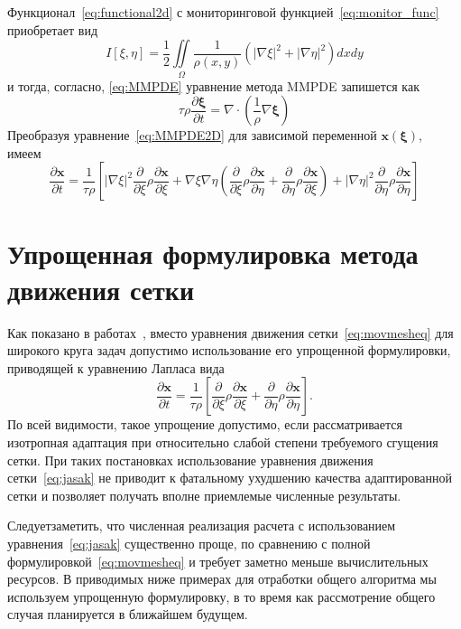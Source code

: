 Функционал~\eqref{eq:functional2d} с мониторинговой функцией~\eqref{eq:monitor_func} приобретает вид 
\begin{equation}
I[\xi,\eta] = \frac{1}{2}\iint\limits_{\Omega}\frac{1}{\rho(x,y)}\left(|\nabla \xi|^2+|\nabla \eta|^2\right)dxdy
\label{eq:2Dfunctional}
\end{equation}
и тогда, согласно, \eqref{eq:MMPDE} уравнение метода MMPDE запишется как 
\begin{equation}
\tau \rho\frac{\partial \boldsymbol\xi}{\partial t} = \nabla\cdot\left(\frac{1}{\rho}\nabla \boldsymbol\xi \right)
\label{eq:MMPDE2D}
\end{equation}
Преобразуя уравнение~\eqref{eq:MMPDE2D} для зависимой переменной  $\mathbf{x}( \boldsymbol\xi)$, имеем~\cite{huang_practical_2001}
\begin{equation}\label{eq:movmesheq}
\frac{\partial \mathbf{x}}{\partial t} = \frac{1}{\tau \rho} 
\left[
|\nabla \xi|^2 \frac{\partial }{\partial \xi}\rho \frac{\partial \mathbf{x}}{\partial \xi} +
\nabla \xi \nabla\eta \left( \frac{\partial }{\partial \xi}\rho \frac{\partial \mathbf{x}}{\partial \eta} +\frac{\partial }{\partial \eta}\rho \frac{\partial \mathbf{x}}{\partial \xi} \right) +
|\nabla \eta|^2 \frac{\partial }{\partial \eta}\rho \frac{\partial \mathbf{x}}{\partial \eta}
\right]
\end{equation}

\section{Упрощенная формулировка метода движения сетки}
Как показано в работах~\cite{jasak_automatic_2006, tukovic_moving_2012}, вместо уравнения движения сетки~\eqref{eq:movmesheq} для широкого круга задач допустимо использование его упрощенной формулировки, приводящей к уравнению Лапласа вида
\begin{equation}\label{eq:jasak}
\frac{\partial \mathbf{x}}{\partial t} = \frac{1}{\tau \rho} 
\left[
 \frac{\partial }{\partial \xi}\rho \frac{\partial \mathbf{x}}{\partial \xi} +
 \frac{\partial }{\partial \eta}\rho \frac{\partial \mathbf{x}}{\partial \eta}
\right].
\end{equation}
По всей видимости, такое упрощение допустимо, если рассматривается изотропная адаптация при относительно слабой степени требуемого сгущения сетки. При таких постановках использование уравнения движения сетки~\eqref{eq:jasak} не приводит к фатальному ухудшению качества адаптированной сетки и позволяет получать вполне приемлемые численные результаты. 

Следуетзаметить, что численная реализация расчета с использованием уравнения~\eqref{eq:jasak} существенно проще, по сравнению с полной формулировкой~\eqref{eq:movmesheq} и требует заметно меньше вычислительных ресурсов. В приводимых ниже примерах для отработки общего алгоритма мы используем упрощенную формулировку, в то время как рассмотрение общего случая планируется в ближайшем будущем.

